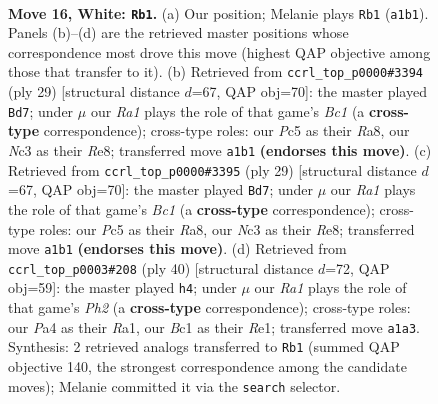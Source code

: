 \documentclass[11pt]{article}
\begin{document}
\clearpage

\begin{figure}[p]\centering
\begin{subfigure}{0.46\textwidth}\centering
\resizebox{\linewidth}{!}{%
\newchessgame
\chessboard[
  setfen={rn2bbr1/1p2k2p/p3p1p1/2P2p1n/P1B5/2N1PP2/1P3RPP/R1B1N1K1 w - - 0 16},
  showmover=false,
  pgfstyle=straightmove, color=movearrow, markmove={a1-b1}
]}
\caption{}
\end{subfigure}\hfill
\begin{subfigure}{0.46\textwidth}\centering
\resizebox{\linewidth}{!}{%
\newchessgame
\chessboard[
  setfen={r1b1r1k1/ppp2p1p/8/3n1p2/1b1Np3/1P2P3/PB1PBPPP/R3K2R b KQ - 1 15},
  showmover=false,
  pgfstyle=straightmove, color=movearrow, markmove={c8-d7}
]}
\caption{}
\end{subfigure}
\\[4pt]
\begin{subfigure}{0.46\textwidth}\centering
\resizebox{\linewidth}{!}{%
\newchessgame
\chessboard[
  setfen={r1b1r1k1/ppp2p1p/8/3n1p2/1b1Np3/1P2P3/PB1PBPPP/R3K2R b KQ - 1 15},
  showmover=false,
  pgfstyle=straightmove, color=movearrow, markmove={c8-d7}
]}
\caption{}
\end{subfigure}\hfill
\begin{subfigure}{0.46\textwidth}\centering
\resizebox{\linewidth}{!}{%
\newchessgame
\chessboard[
  setfen={4r1k1/r2nbpp1/bp2p2p/p7/P1pPNB2/2P5/1P2BPPP/R3R1K1 w - - 1 21},
  showmover=false,
  pgfstyle=straightmove, color=movearrow, markmove={h2-h4}
]}
\caption{}
\end{subfigure}
\caption{\textbf{Move 16, White: \texttt{Rb1}.} (a) Our position; Melanie plays \texttt{Rb1} (\texttt{a1b1}). Panels (b)--(d) are the retrieved master positions whose correspondence most drove this move (highest QAP objective among those that transfer to it). (b) Retrieved from \texttt{ccrl\_top\_p0000\#3394} (ply 29) [structural distance $d$=67, QAP obj=70]: the master played \texttt{Bd7}; under $\mu$ our \emph{Ra1} plays the role of that game's \emph{Bc1} (a \textbf{cross-type} correspondence); cross-type roles: our \emph{P}c5 as their \emph{R}a8, our \emph{N}c3 as their \emph{R}e8; transferred move \texttt{a1b1} \textbf{(endorses this move)}. (c) Retrieved from \texttt{ccrl\_top\_p0000\#3395} (ply 29) [structural distance $d$=67, QAP obj=70]: the master played \texttt{Bd7}; under $\mu$ our \emph{Ra1} plays the role of that game's \emph{Bc1} (a \textbf{cross-type} correspondence); cross-type roles: our \emph{P}c5 as their \emph{R}a8, our \emph{N}c3 as their \emph{R}e8; transferred move \texttt{a1b1} \textbf{(endorses this move)}. (d) Retrieved from \texttt{ccrl\_top\_p0003\#208} (ply 40) [structural distance $d$=72, QAP obj=59]: the master played \texttt{h4}; under $\mu$ our \emph{Ra1} plays the role of that game's \emph{Ph2} (a \textbf{cross-type} correspondence); cross-type roles: our \emph{P}a4 as their \emph{R}a1, our \emph{B}c1 as their \emph{R}e1; transferred move \texttt{a1a3}. Synthesis: 2 retrieved analogs transferred to \texttt{Rb1} (summed QAP objective 140, the strongest correspondence among the candidate moves); Melanie committed it via the \texttt{search} selector.}
\label{fig:thought-m30}
\end{figure}
\end{document}
